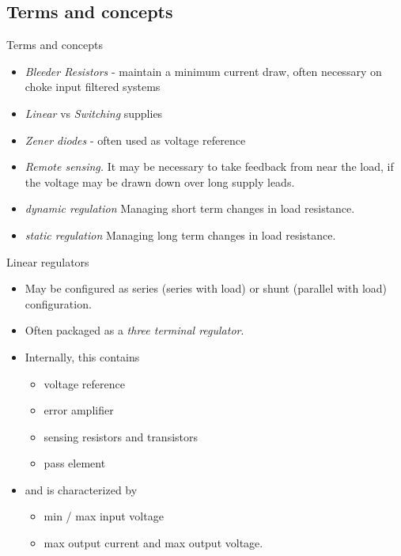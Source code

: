 \documentclass{beamer}
\begin{document}
\subsection{Terms and concepts}
\begin{frame}{Terms and concepts}{}
\begin{itemize}
\item {\em Bleeder Resistors} - maintain a minimum current draw, often necessary on choke input filtered systems
\item {\em Linear} vs {\em Switching} supplies
\item {\em Zener diodes} - often used as voltage reference
\item {\em Remote sensing.}  It may be necessary to take feedback from near the load, if the voltage may be drawn down over long supply leads.
\item {\em dynamic regulation} Managing short term changes in load resistance.
\item {\em static regulation} Managing long term changes in load resistance.
\end{itemize}

\end{frame}

\begin{frame}{Linear regulators}{}
\begin{itemize}
\item May be configured as series (series with load) or shunt (parallel with load) configuration.
\item Often packaged as a {\em three terminal regulator}.  
\item Internally, this contains
\begin{itemize}
\item voltage reference
\item error amplifier
\item sensing resistors and transistors
\item pass element
\end{itemize} 
\item and is characterized by
\begin{itemize}
\item min / max input voltage
\item max output current and max output voltage.
\end{itemize} 
\end{itemize}

\end{frame}


\end{document}
